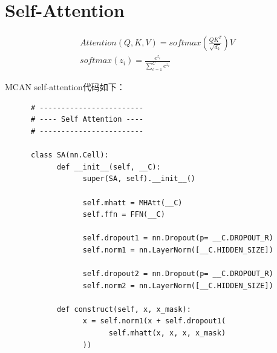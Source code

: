 \documentclass[a4paper]{article}
\begin{document}
\begin{sloppypar}


      \section{Self-Attention}

      \begin{gather}
            Attention(Q,K,V)=softmax(\frac{QK^T}{\sqrt{d_k}})V\\
            softmax(z_i)=\frac{e^{z_i}}{\sum_{c=1}^C e^{z_c}}
      \end{gather}

      MCAN self-attention代码如下：
      \begin{lstlisting}
      # ------------------------
      # ---- Self Attention ----
      # ------------------------

      class SA(nn.Cell):
            def __init__(self, __C):
                  super(SA, self).__init__()

                  self.mhatt = MHAtt(__C)
                  self.ffn = FFN(__C)

                  self.dropout1 = nn.Dropout(p= __C.DROPOUT_R)
                  self.norm1 = nn.LayerNorm([__C.HIDDEN_SIZE])

                  self.dropout2 = nn.Dropout(p= __C.DROPOUT_R)
                  self.norm2 = nn.LayerNorm([__C.HIDDEN_SIZE])

            def construct(self, x, x_mask):
                  x = self.norm1(x + self.dropout1(
                        self.mhatt(x, x, x, x_mask)
                  ))


\end{lstlisting}
\end{sloppypar}
\end{document}
